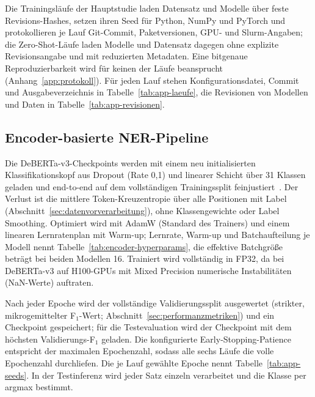 Die Trainingsläufe der Hauptstudie laden Datensatz und Modelle über feste
Revisions-Hashes, setzen ihren Seed für Python, NumPy und PyTorch und
protokollieren je Lauf Git-Commit, Paketversionen, GPU- und
Slurm-Angaben; die Zero-Shot-Läufe
laden Modelle und Datensatz dagegen ohne explizite Revisionsangabe und mit
reduzierten Metadaten.
Eine bitgenaue Reproduzierbarkeit wird für keinen der Läufe beansprucht
(Anhang~\ref{app:protokoll}).
Für jeden Lauf stehen Konfigurationsdatei, Commit und Ausgabeverzeichnis
in Tabelle~\ref{tab:app-laeufe}, die Revisionen von Modellen und Daten in
Tabelle~\ref{tab:app-revisionen}.

\subsection{Encoder-basierte NER-Pipeline}
\label{sec:encoder-pipeline}

Die DeBERTa-v3-Checkpoints werden mit einem neu initialisierten
Klassifikationskopf aus Dropout (Rate 0,1) und linearer Schicht über 31
Klassen geladen und end-to-end auf dem vollständigen Trainingssplit
feinjustiert~\cite{devlin2019bert,wolf2020transformers}.
Der Verlust ist die mittlere Token-Kreuzentropie über alle Positionen mit
Label (Abschnitt~\ref{sec:datenvorverarbeitung}), ohne Klassengewichte
oder Label Smoothing.
Optimiert wird mit AdamW (Standard des Trainers) und einem linearen
Lernratenplan mit Warm-up; Lernrate, Warm-up und Batchaufteilung je Modell
nennt Tabelle~\ref{tab:encoder-hyperparams}, die effektive Batchgröße
beträgt bei beiden Modellen 16.
Trainiert wird vollständig in FP32, da bei DeBERTa-v3 auf H100-GPUs mit
Mixed Precision numerische Instabilitäten (NaN-Werte) auftraten.

Nach jeder Epoche wird der vollständige Validierungssplit ausgewertet
(strikter, mikrogemittelter F$_1$-Wert;
Abschnitt~\ref{sec:performanzmetriken}) und ein Checkpoint gespeichert;
für die Testevaluation wird der Checkpoint mit dem höchsten
Validierungs-F$_1$ geladen.
Die konfigurierte Early-Stopping-Patience entspricht der maximalen
Epochenzahl, sodass alle sechs Läufe die volle Epochenzahl durchliefen.
Die je Lauf gewählte Epoche nennt Tabelle~\ref{tab:app-seeds}.
In der Testinferenz wird jeder Satz einzeln verarbeitet und die Klasse
per argmax bestimmt.


